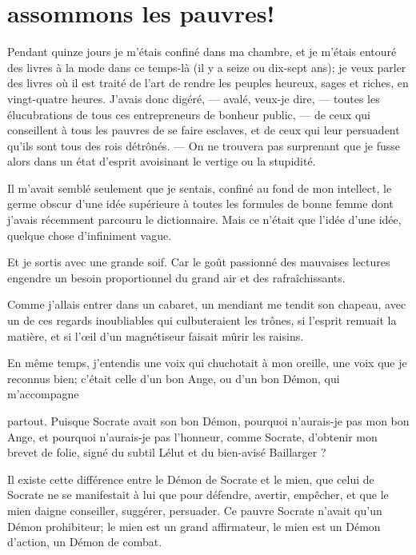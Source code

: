 \quebra\section[Assommons les pauvres!]{assommons les pauvres!}

Pendant quinze jours je m’étais confiné dans ma
chambre, et je m’étais entouré des livres à la mode
dans ce temps{}-là (il y a seize ou dix{}-sept ans); je veux parler des
livres où il est traité de l’art de rendre les peuples
heureux, sages et riches, en vingt{}-quatre heures.
J’avais donc digéré, --- avalé, veux{}-je dire, --- toutes
les élucubrations de tous ces entrepreneurs de bonheur public, --- de
ceux qui conseillent à tous les pauvres de se faire esclaves, et de
ceux qui leur persuadent qu’ils sont tous des rois
détrônés. --- On ne trouvera pas surprenant que je fusse alors dans un
état d’esprit avoisinant le vertige ou la stupidité.

Il m’avait semblé seulement que je sentais, confiné au
fond de mon intellect, le germe obscur d’une idée
supérieure à toutes les formules de bonne femme dont
j’avais récemment parcouru le dictionnaire. Mais ce
n’était que l’idée
d’une idée, quelque chose
d’infiniment vague.

Et je sortis avec une grande soif. Car le goût passionné des mauvaises
lectures engendre un besoin proportionnel du grand air et des
rafraîchissants.

Comme j’allais entrer dans un cabaret, un mendiant me
tendit son chapeau, avec un de ces regards inoubliables qui
culbuteraient les trônes, si l’esprit remuait la
matière, et si l’\oe il d’un
magnétiseur faisait mûrir les raisins.

En même temps, j’entendis une voix qui chuchotait à mon
oreille, une voix que je reconnus bien; c’était celle
d’un bon Ange, ou d’un bon Démon, qui
m’accompagne \linebreak

\quebra

\noindent{}partout. Puisque Socrate avait son bon
Démon, pourquoi n’aurais{}-je pas mon bon Ange, et
pourquoi n’aurais{}-je pas l’honneur,
comme Socrate, d’obtenir mon brevet de folie, signé du
subtil Lélut et du bien{}-avisé Baillarger ?

Il existe cette différence entre le Démon de Socrate et le mien, que
celui de Socrate ne se manifestait à lui que pour défendre, avertir,
empêcher, et que le mien daigne conseiller, suggérer, persuader. Ce
pauvre Socrate n’avait qu’un Démon
prohibiteur; le mien est un grand affirmateur, le mien est un Démon
d’action, un Démon de combat.

